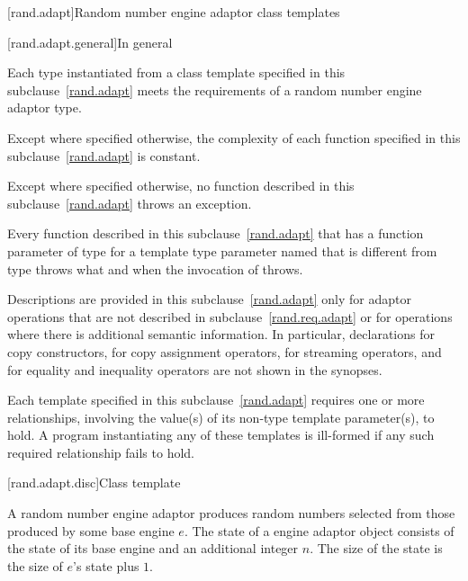 [rand.adapt]{Random number engine adaptor class templates}

[rand.adapt.general]{In general}

\pnum
Each type instantiated
from a class template specified in this subclause~\ref{rand.adapt}
meets the requirements
of a random number engine adaptor type.

\pnum
Except where specified otherwise,
the complexity of each function
specified in this subclause~\ref{rand.adapt}
is constant.

\pnum
Except where specified otherwise,
no function described in this subclause~\ref{rand.adapt}
throws an exception.

\pnum
Every function described in this subclause~\ref{rand.adapt}
that has a function parameter  of type 
for a template type parameter named 
that is different from type 
throws what and when the invocation of  throws.

\pnum
Descriptions are provided in this subclause~\ref{rand.adapt}
only for adaptor operations
that are not described in subclause~\ref{rand.req.adapt}
or for operations where there is additional semantic information.
In particular,
declarations for copy constructors,
for copy assignment operators,
for streaming operators,
and for equality and inequality operators
are not shown in the synopses.

\pnum
Each template specified in this subclause~\ref{rand.adapt}
requires one or more relationships,
involving the value(s) of its non-type template parameter(s), to hold.
A program instantiating any of these templates
is ill-formed
if any such required relationship fails to hold.


[rand.adapt.disc]{Class template }%
%

\pnum
A  random number engine adaptor
produces random numbers
selected from those produced by some base engine $e$.
The state%
%
of a  engine adaptor object 
consists of the state  of its base engine 
and an additional integer $n$.
The size of the state is
 the size of $e$'s state plus $1$.

